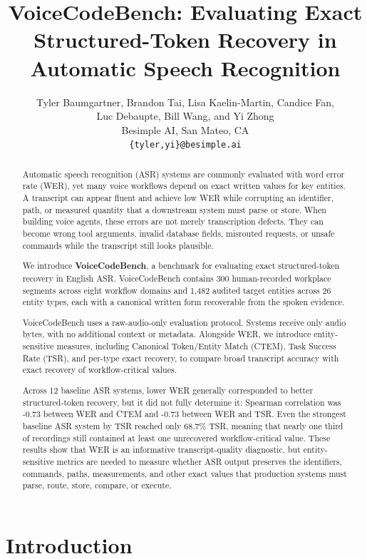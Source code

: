 \documentclass[10pt,twocolumn]{article}
\title{VoiceCodeBench: Evaluating Exact Structured-Token Recovery in Automatic Speech Recognition}
\author{Tyler Baumgartner, Brandon Tai, Lisa Kaelin-Martin, Candice Fan,\\
Luc Debaupte, Bill Wang, and Yi Zhong\\
Besimple AI, San Mateo, CA\\
\texttt{\{tyler,yi\}@besimple.ai}}
\date{}
\begin{document}
\maketitle

\begin{abstract}

	Automatic speech recognition (ASR) systems are commonly evaluated with word
	error rate (WER), yet many voice workflows depend on exact written
	values for key entities. A transcript can appear fluent and achieve low WER
	while corrupting an identifier, path, or measured quantity that a
	downstream system must parse or store. When building voice agents, these 
	errors are not merely transcription defects. They can become wrong tool 
	arguments, invalid database fields, misrouted requests, or unsafe commands 
	while the transcript still looks plausible.

	We introduce \textbf{VoiceCodeBench}, a benchmark for evaluating exact
	structured-token recovery in English ASR\@. VoiceCodeBench contains 300
	human-recorded workplace segments across eight workflow domains and
	1,482 audited target entities across 26 entity types, each with a
	canonical written form recoverable from the spoken evidence.

	VoiceCodeBench uses a raw-audio-only evaluation protocol. Systems
	receive only audio bytes, with no additional context or metadata. Alongside
	WER, we introduce entity-sensitive measures, including Canonical
	Token/Entity Match (CTEM), Task Success Rate (TSR), and per-type exact
	recovery, to compare broad transcript accuracy with exact recovery of
	workflow-critical values.

	Across 12 baseline ASR systems, lower WER generally corresponded to better
	structured-token recovery, but it did not fully determine it: Spearman
	correlation was -0.73 between WER and CTEM and -0.73 between WER and TSR\@.
	Even the strongest baseline ASR system by TSR reached only 68.7\% TSR,
	meaning that nearly one third of recordings still contained at least
	one unrecovered workflow-critical value. These results show that WER is
	an informative transcript-quality diagnostic, but entity-sensitive
	metrics are needed to measure whether ASR output preserves the
	identifiers, commands, paths, measurements, and other exact values that
	production systems must parse, route, store, compare, or execute.
\end{abstract}

\section{Introduction}\label{introduction}
\end{document}
